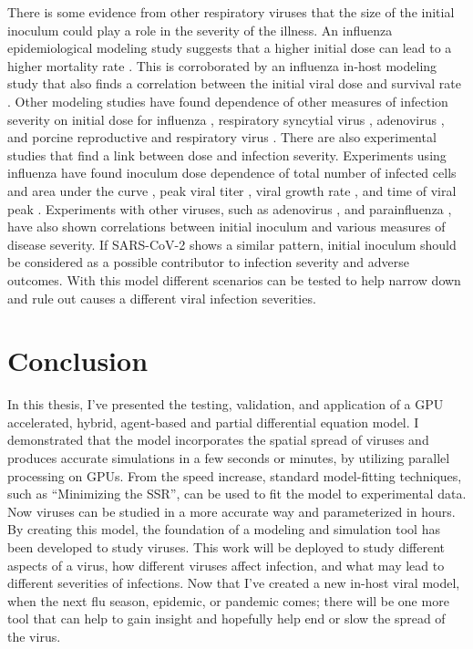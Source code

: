 There is some evidence from other respiratory viruses that the size of the initial inoculum could play a role in the severity of the illness. An influenza epidemiological modeling study suggests that a higher initial dose can lead to a higher mortality rate \citep{paulo10}. This is corroborated by an influenza in-host modeling study that also finds a correlation between the initial viral dose and survival rate \citep{price15}. Other modeling studies have found dependence of other measures of infection severity on initial dose for influenza \citep{moore20}, respiratory syncytial virus \citep{wethington19}, adenovirus \citep{li14}, and porcine reproductive and respiratory virus \citep{go19}. There are also experimental studies that find a link between dose and infection severity. Experiments using influenza have found inoculum dose dependence of total number of infected cells and area under the curve \citep{manicassamy10}, peak viral titer \citep{ginsberg52,iida63,ottolini05}, viral growth rate \citep{ginsberg52}, and time of viral peak \citep{iida63,ginsberg52}. Experiments with other viruses, such as adenovirus \citep{prince93}, and parainfluenza \citep{ottolini96}, have also shown correlations between initial inoculum and various measures of disease severity. If SARS-CoV-2 shows a similar pattern, initial inoculum should be considered as a possible contributor to infection severity and adverse outcomes. With this model different scenarios can be tested to help narrow down and rule out causes a different viral infection severities. 

\section{Conclusion}

In this thesis, I've presented the testing, validation, and application of a GPU accelerated, hybrid, agent-based and partial differential equation model. I demonstrated that the model incorporates the spatial spread of viruses and produces accurate simulations in a few seconds or minutes, by utilizing parallel processing on GPUs. From the speed increase, standard model-fitting techniques, such as ``Minimizing the SSR'', can be used to fit the model to experimental data. Now viruses can be studied in a more accurate way and parameterized in hours. By creating this model, the foundation of a modeling and simulation tool has been developed to study viruses. This work will be deployed to study different aspects of a virus, how different viruses affect infection, and what may lead to different severities of infections. Now that I've created a new in-host viral model, when the next flu season, epidemic, or pandemic comes; there will be one more tool that can help to gain insight and hopefully help end or slow the spread of the virus.












